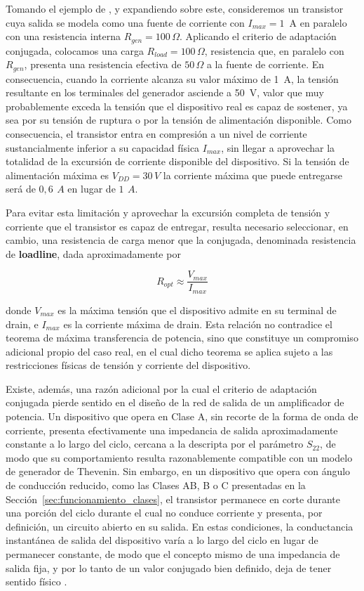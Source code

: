 Tomando el ejemplo de \cite[p.~12]{cripps2006}, y expandiendo sobre este, consideremos un transistor cuya salida se modela como una fuente de corriente con $I_{max}=1$~A en paralelo con una resistencia interna $R_{gen}=100\,\Omega$. Aplicando el criterio de adaptación conjugada, colocamos una carga $R_{load}=100\,\Omega$, resistencia que, en paralelo con $R_{gen}$, presenta una resistencia efectiva de $50\,\Omega$ a la fuente de corriente. En consecuencia, cuando la corriente alcanza su valor máximo de 1~A, la tensión resultante en los terminales del generador asciende a 50~V, valor que muy probablemente exceda la tensión que el dispositivo real es capaz de sostener, ya sea por su tensión de ruptura o por la tensión de alimentación disponible. Como consecuencia, el transistor entra en compresión a un nivel de corriente sustancialmente inferior a su capacidad física $I_{max}$, sin llegar a aprovechar la totalidad de la excursión de corriente disponible del dispositivo. Si la tensión de alimentación máxima es $V_{DD}=30\,V$ la corriente máxima que puede entregarse será de $0,6~\,A$ en lugar de $1~\,A$.

Para evitar esta limitación y aprovechar la excursión completa de tensión y corriente que el transistor es capaz de entregar, resulta necesario seleccionar, en cambio, una resistencia de carga menor que la conjugada, denominada resistencia de \textbf{loadline}, dada aproximadamente por

\begin{equation}
    R_{opt} \approx \frac{V_{max}}{I_{max}}
    \label{eq:rl_optima}
\end{equation}

donde $V_{max}$ es la máxima tensión que el dispositivo admite en su terminal de drain, e $I_{max}$ es la corriente máxima de drain. Esta relación no contradice el teorema de máxima transferencia de potencia, sino que constituye un compromiso adicional propio del caso real, en el cual dicho teorema se aplica sujeto a las restricciones físicas de tensión y corriente del dispositivo.

Existe, además, una razón adicional por la cual el criterio de adaptación conjugada pierde sentido en el diseño de la red de salida de un amplificador de potencia. Un dispositivo que opera en Clase A, sin recorte de la forma de onda de corriente, presenta efectivamente una impedancia de salida aproximadamente constante a lo largo del ciclo, cercana a la descripta por el parámetro $S_{22}$, de modo que su comportamiento resulta razonablemente compatible con un modelo de generador de Thevenin. Sin embargo, en un dispositivo que opera con ángulo de conducción reducido, como las Clases AB, B o C presentadas en la Sección~\ref{sec:funcionamiento_clases}, el transistor permanece en corte durante una porción del ciclo durante el cual no conduce corriente y presenta, por definición, un circuito abierto en su salida. En estas condiciones, la conductancia instantánea de salida del dispositivo varía a lo largo del ciclo en lugar de permanecer constante, de modo que el concepto mismo de una impedancia de salida fija, y por lo tanto de un valor conjugado bien definido, deja de tener sentido físico \cite[p.~13]{cripps2006}.

